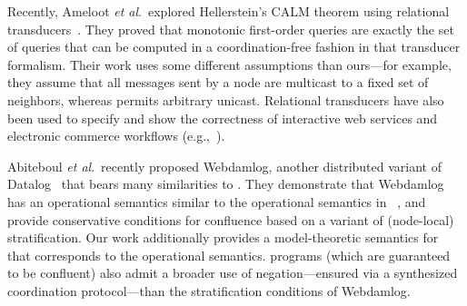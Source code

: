 Recently, Ameloot \emph{et al}.\ explored Hellerstein's CALM theorem using
relational transducers~\cite{relational-transducers}.  They proved that
monotonic first-order queries are exactly the set of queries that can be
computed in a coordination-free fashion in that transducer formalism.  Their
work uses some different assumptions than ours---for example, they assume that
all messages sent by a node are multicast to a fixed set of neighbors, whereas
\lang permits arbitrary unicast. Relational transducers have also been used to
specify and show the correctness of interactive web services and electronic
commerce workflows
(e.g.,~\cite{trans-ecommerce,deutsch-icdt,deutsch-web-app}).%

Abiteboul \emph{et al}.\ recently proposed Webdamlog, another distributed variant of
Datalog~\cite{Abiteboul2011} that bears many similarities to \lang.  They demonstrate that Webdamlog has an
operational semantics similar to the operational semantics in \lang~\cite{ameloot-operational},
and provide conservative conditions for confluence based on a variant of (node-local) stratification.
Our work additionally provides a model-theoretic semantics for \plang that corresponds to the operational semantics.  
\plang programs (which are guaranteed to be confluent) 
also admit a broader use of negation---ensured via a synthesized
coordination protocol---than the stratification conditions of Webdamlog.

